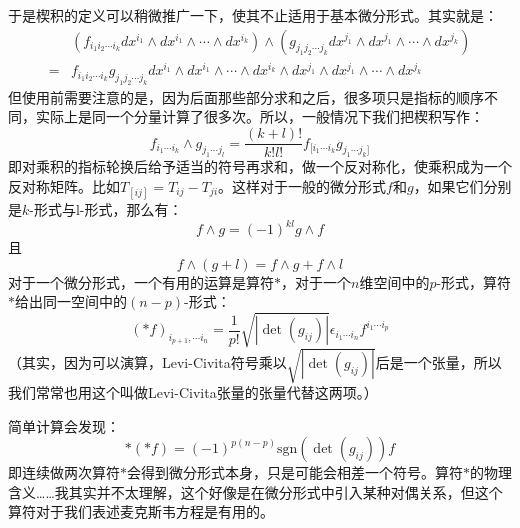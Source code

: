 \documentclass{ctexart}
\newcommand\non{\nonumber \\}
\begin{document}
于是楔积的定义可以稍微推广一下，使其不止适用于基本微分形式。其实就是：
\begin{align}
&(f_{i_1i_2\cdots i_k}dx^{i_1}\wedge dx^{i_1}\wedge\cdots\wedge dx^{i_k})\wedge(g_{j_1j_2\cdots j_k}dx^{j_1}\wedge dx^{j_1}\wedge\cdots\wedge dx^{j_k})\non
=&f_{i_1i_2\cdots i_k}g_{j_1j_2\cdots j_k}dx^{i_1}\wedge dx^{i_1}\wedge\cdots\wedge dx^{i_k}\wedge dx^{j_1}\wedge dx^{j_1}\wedge\cdots\wedge dx^{j_k}
\end{align}
但使用前需要注意的是，因为后面那些部分求和之后，很多项只是指标的顺序不同，实际上是同一个分量计算了很多次。所以，一般情况下我们把楔积写作：
\begin{equation}
f_{i_1\cdots i_k}\wedge g_{j_1\cdots j_l}=\frac{(k+l)!}{k!l!}f_{[i_1\cdots i_k}g_{j_1\cdots j_k]}
\end{equation}
即对乘积的指标轮换后给予适当的符号再求和，做一个反对称化，使乘积成为一个反对称矩阵。比如$T_{[ij]}=T_{ij}-T_{ji}$。这样对于一般的微分形式$f$和$g$，如果它们分别是$k$-形式与l-形式，那么有：
\begin{equation}
f\wedge g=(-1)^{kl}g\wedge f
\end{equation}
且
\begin{equation}
f\wedge(g+l)=f\wedge g+f\wedge l
\end{equation}
对于一个微分形式，一个有用的运算是算符$*$，对于一个$n$维空间中的$p$-形式，算符$*$给出同一空间中的$(n-p)$-形式：
\begin{equation}
(*f)_{i_{p+1},\cdots i_n}=\frac{1}{p!}\sqrt{|\det(g_{ij})|}\epsilon_{i_1\cdots i_n}f^{i_1\cdots i_p}
\end{equation}
（其实，因为可以演算，Levi-Civita符号乘以$\sqrt{|\det(g_{ij})|}$后是一个张量，所以我们常常也用这个叫做Levi-Civita张量的张量代替这两项。）

简单计算会发现：
\begin{equation}
*(*f)=(-1)^{p(n-p)}\mathrm{sgn}(\det(g_{ij}))f
\end{equation}
即连续做两次算符$*$会得到微分形式本身，只是可能会相差一个符号。算符$*$的物理含义……我其实并不太理解，这个好像是在微分形式中引入某种对偶关系，但这个算符对于我们表述麦克斯韦方程是有用的。
\end{document}
